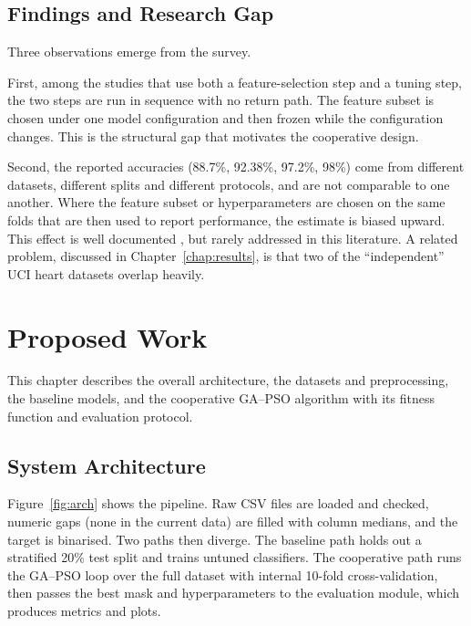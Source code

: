\documentclass[MTech]{ugthesis}
\begin{document}
\section{Findings and Research Gap}
\label{sec:gap}
Three observations emerge from the survey.

First, among the studies that use both a feature-selection step and a tuning step, the two steps are run in sequence with no return path. The feature subset is chosen under one model configuration and then frozen while the configuration changes. This is the structural gap that motivates the cooperative design.

Second, the reported accuracies (88.7\%, 92.38\%, 97.2\%, 98\%) come from different datasets, different splits and different protocols, and are not comparable to one another. Where the feature subset or hyperparameters are chosen on the same folds that are then used to report performance, the estimate is biased upward. This effect is well documented \citep{varma2006bias,cawley2010overfitting}, but rarely addressed in this literature. A related problem, discussed in Chapter~\ref{chap:results}, is that two of the ``independent'' UCI heart datasets overlap heavily.

\chapter{Proposed Work}
\label{chap:proposed}

This chapter describes the overall architecture, the datasets and preprocessing, the baseline models, and the cooperative GA--PSO algorithm with its fitness function and evaluation protocol.

\section{System Architecture}
Figure~\ref{fig:arch} shows the pipeline. Raw CSV files are loaded and checked, numeric gaps (none in the current data) are filled with column medians, and the target is binarised. Two paths then diverge. The baseline path holds out a stratified 20\% test split and trains untuned classifiers. The cooperative path runs the GA--PSO loop over the full dataset with internal 10-fold cross-validation, then passes the best mask and hyperparameters to the evaluation module, which produces metrics and plots.
\end{document}
